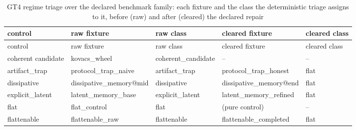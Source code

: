 \begin{longtable}{>{\raggedright\arraybackslash}p{2.4cm}>{\raggedright\arraybackslash}p{3.3cm}>{\raggedright\arraybackslash}p{2.4cm}>{\raggedright\arraybackslash}p{3.5cm}>{\raggedright\arraybackslash}p{2.2cm}}
\caption{GT4 regime triage over the declared benchmark family: each fixture and the class the deterministic triage assigns to it, before (raw) and after (cleared) the declared repair}\label{tab:gt4-regime-triage} \\
\toprule
control & raw fixture & raw class & cleared fixture & cleared class \\
\midrule
\endfirsthead
\toprule
control & raw fixture & raw class & cleared fixture & cleared class \\
\midrule
\endhead
\bottomrule
\endfoot
coherent candidate & kovacs\_\allowbreak{}wheel & coherent\_\allowbreak{}candidate & -- & -- \\
artifact\_\allowbreak{}trap & protocol\_\allowbreak{}trap\_\allowbreak{}naive & artifact\_\allowbreak{}trap & protocol\_\allowbreak{}trap\_\allowbreak{}honest & flat \\
dissipative & dissipative\_\allowbreak{}memory@mid & dissipative & dissipative\_\allowbreak{}memory@end & flat \\
explicit\_\allowbreak{}latent & latent\_\allowbreak{}memory\_\allowbreak{}base & explicit\_\allowbreak{}latent & latent\_\allowbreak{}memory\_\allowbreak{}refined & flat \\
flat & flat\_\allowbreak{}control & flat & (pure control) & -- \\
flattenable & flattenable\_\allowbreak{}raw & flattenable & flattenable\_\allowbreak{}completed & flat \\
\bottomrule
\end{longtable}
